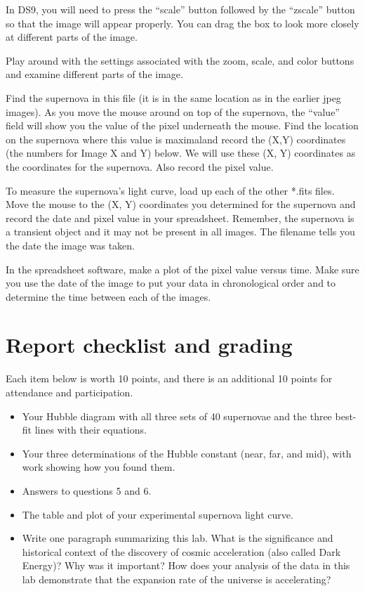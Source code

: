 In DS9, you will need to press the “scale” button followed by the “zscale”
button so that the image will appear properly. You can drag the box to
look more closely at different parts of the image.
\begin{steps}
	\item Play around with the
	settings associated with the zoom, scale, and color buttons and examine
	different parts of the image.
	
	\item Find the supernova in this file (it is in the same location as in the earlier
	jpeg images). As you move the mouse around on top of the supernova,
	the “value” field will show you the value of the pixel underneath the
	mouse. Find the location on the supernova where this value is maximaland record the (X,Y) coordinates (the numbers for Image X and Y)
	below. We will use these (X, Y) coordinates as the coordinates for the
	supernova. Also record the pixel value.
	
	\item To measure the supernova’s light curve, load up each of the other *.fits
	files. Move the mouse to the (X, Y) coordinates you determined for the
	supernova and record the date and pixel value in your spreadsheet. Remember, the
	supernova is a transient object and it may not be present in all images.
	The filename tells you the date the image was taken.
	
	\item In the spreadsheet software, make a plot of the pixel value versus time. Make sure you use
	the date of the image to put your data in chronological order and to
	determine the time between each of the images.
\end{steps}

\section{Report checklist and grading}

Each item below is worth 10 points, and there is an additional 10 points for attendance and participation.

\begin{itemize}
	\item Your Hubble diagram with all three sets of 40 supernovae and the three best-fit lines with their equations.
	
	\item Your three determinations of the Hubble constant (near, far, and mid), with work showing how you found them.
	
	\item Answers to questions 5 and 6.
	
	\item The table and plot of your experimental supernova light curve.
	
	\item Write
	one paragraph summarizing this lab. What is the significance and
	historical context of the discovery of cosmic acceleration (also called
	Dark Energy)? Why was it important? How does your analysis of the
	data in this lab demonstrate that the expansion rate of the universe is
	accelerating?
\end{itemize}